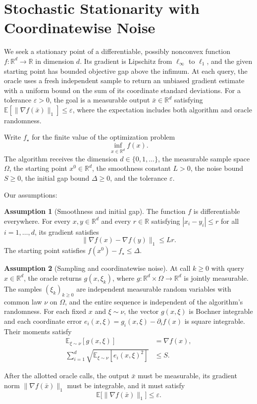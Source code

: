 \documentclass[10pt]{article}
\theoremstyle{definition}
\newtheorem{assumption}{Assumption}
\begin{document}
\section*{Stochastic Stationarity with Coordinatewise Noise}
We seek a stationary point of a differentiable, possibly nonconvex function $f:\mathbb{R}^d\to\mathbb{R}$ in dimension $d$. Its gradient is Lipschitz from $\ell_\infty$ to $\ell_1$, and the given starting point has bounded objective gap above the infimum. At each query, the oracle uses a fresh independent sample to return an unbiased gradient estimate with a uniform bound on the sum of its coordinate standard deviations. For a tolerance $\varepsilon>0$, the goal is a measurable output $\bar{x}\in\mathbb{R}^d$ satisfying $\mathbb{E}[\|\nabla f(\bar{x})\|_1]\leq\varepsilon$, where the expectation includes both algorithm and oracle randomness.

Write $f_\star$ for the finite value of the optimization problem
\[
\inf_{x\in\mathbb{R}^d} f(x).
\]
The algorithm receives the dimension $d\in\{0,1,\ldots\}$, the measurable sample space $\Omega$, the starting point $x^0\in\mathbb{R}^d$, the smoothness constant $L>0$, the noise bound $S\geq 0$, the initial gap bound $\Delta\geq 0$, and the tolerance $\varepsilon$.

Our assumptions:
\begin{assumption}[Smoothness and initial gap]
The function $f$ is differentiable everywhere. For every $x,y\in\mathbb{R}^d$ and every $r\in\mathbb{R}$ satisfying $|x_i-y_i|\leq r$ for all $i=1,\ldots,d$, its gradient satisfies
\[
\|\nabla f(x)-\nabla f(y)\|_1\leq Lr.
\]
The starting point satisfies $f(x^0)-f_\star\leq\Delta$.
\end{assumption}

\begin{assumption}[Sampling and coordinatewise noise]
At call $k\geq 0$ with query $x\in\mathbb{R}^d$, the oracle returns $g(x,\xi_k)$, where $g:\mathbb{R}^d\times\Omega\to\mathbb{R}^d$ is jointly measurable. The samples $(\xi_k)_{k\geq 0}$ are independent measurable random variables with common law $\nu$ on $\Omega$, and the entire sequence is independent of the algorithm's randomness. For each fixed $x$ and $\xi\sim\nu$, the vector $g(x,\xi)$ is Bochner integrable and each coordinate error $e_i(x,\xi)=g_i(x,\xi)-\partial_i f(x)$ is square integrable. Their moments satisfy
\[
\begin{aligned}
\mathbb{E}_{\xi\sim\nu}[g(x,\xi)] &= \nabla f(x),\\
\sum_{i=1}^d \sqrt{\mathbb{E}_{\xi\sim\nu}[e_i(x,\xi)^2]} &\leq S.
\end{aligned}
\]
\end{assumption}

After the allotted oracle calls, the output $\bar{x}$ must be measurable, its gradient norm $\|\nabla f(\bar{x})\|_1$ must be integrable, and it must satisfy
\[
\mathbb{E}\bigl[\|\nabla f(\bar{x})\|_1\bigr]\leq\varepsilon.
\]
\end{document}
